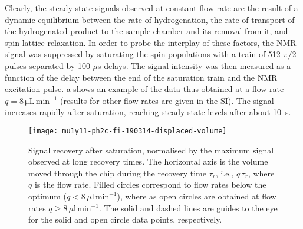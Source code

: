 Clearly, the steady-state signals observed at constant flow rate are the result
of a dynamic equilibrium between the rate of hydrogenation, the rate of
transport of the hydrogenated product to the sample chamber and its removal
from it, and spin-lattice relaxation. In order to probe the interplay of these
factors, the NMR signal was suppressed by saturating the spin populations
with a train of 512 $\pi/2$ pulses separated by 100 $\mu$s delays.
The signal intensity was then measured as a function of the delay between the
end of the saturation train and the NMR excitation pulse.
a shows an example of the data thus obtained at a
flow rate $q=8\,\mathrm{\mu L\,\text{min}^{-1}}$ (results for
other flow rates are given in the SI).
The signal increases rapidly after saturation, reaching
steady-state levels after about 10~s.

\begin{figure}
  \begin{center}
  \texttt{[image: mu1y11-ph2c-fi-190314-displaced-volume]}
  \end{center}
  \caption{Signal recovery after saturation, normalised by the maximum signal
  observed at long recovery times. The horizontal axis is the volume
  moved through the chip during the recovery time $\tau_r$, i.e., $q\,\tau_r$,
  where $q$ is the flow rate. Filled circles correspond to flow rates below
  the optimum ($q<8\,\mu\mathrm{l}\,\text{min}^{-1}$), where as open circles
  are obtained at flow rates $q\ge 8\,\mu\mathrm{l}\,\text{min}^{-1}$. The solid
  and dashed lines are guides to the eye for the solid and open circle data points,
  respectively.}
  \label{fig:displaced-volume}
\end{figure}

